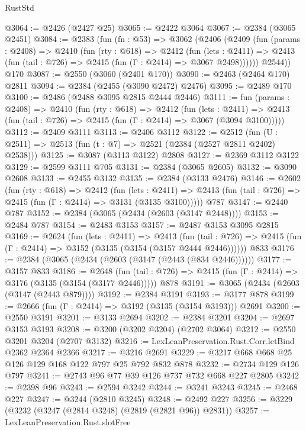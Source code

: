 \begin{lexlean}{RustStd}
\begin{coremodule}
@3064 := @2426 (@2427 @25)
@3065 := @2422 @3064
@3067 := @2384 (@3065 @2451)
@3084 := @2383
    (fun (fn : @53) =>
    @3062
      (@2406
        (@2409
          (fun (params : @2408) =>
          @2410
            (fun (rty : @618) =>
            @2412
              (fun (lets : @2411) =>
              @2413 (fun (tail : @726) => @2415 (fun (Γ : @2414) => @3067 @2498))))))
        @2544))
    @170
@3087 := @2550 (@3060 (@2401 @170))
@3090 := @2463 (@2464 @170) @2811
@3094 := @2384 (@2455 (@3090 @2472) @2476)
@3095 := @2489 @170
@3100 := @2486 (@2488 @3095 @2815 @2444 @2446)
@3111 := fun (params : @2408) =>
  @2410
    (fun (rty : @618) =>
    @2412
      (fun (lets : @2411) =>
      @2413 (fun (tail : @726) => @2415 (fun (Γ : @2414) => @3067 (@3094 @3100)))))
@3112 := @2409 @3111
@3113 := @2406 @3112
@3122 := @2512 (fun (U : @2511) => @2513 (fun (t : @7) => @2521 (@2384 (@2527 @2811 @2402) @2538)))
@3125 := @3087 (@3113 @3122) @2808
@3127 := @2369 @3112 @3122
@3129 := @2599 @3111 @705
@3131 := @2384 (@3065 @2605)
@3132 := @3090 @2608
@3133 := @2455 @3132
@3135 := @2384 (@3133 @2476)
@3146 := @2602
    (fun (rty : @618) =>
    @2412
      (fun (lets : @2411) =>
      @2413 (fun (tail : @726) => @2415 (fun (Γ : @2414) => @3131 (@3135 @3100)))))
    @787
@3147 := @2440 @787
@3152 := @2384 (@3065 (@2434 (@2603 (@3147 @2448))))
@3153 := @2484 @787
@3154 := @2483 @3153
@3157 := @2487 @3153 @3095 @2815
@3169 := @2624
    (fun (lets : @2411) =>
    @2413
      (fun (tail : @726) => @2415 (fun (Γ : @2414) => @3152 (@3135 (@3154 (@3157 @2444 @2446))))))
    @833
@3176 := @2384 (@3065 (@2434 (@2603 (@3147 (@2443 (@834 @2446))))))
@3177 := @3157 @833
@3186 := @2648
    (fun (tail : @726) => @2415 (fun (Γ : @2414) => @3176 (@3135 (@3154 (@3177 @2446)))))
    @878
@3191 := @3065 (@2434 (@2603 (@3147 (@2443 @879))))
@3192 := @2384 @3191
@3193 := @3177 @878
@3199 := @2666 (fun (Γ : @2414) => @3192 (@3135 (@3154 @3193))) @2691
@3200 := @2550 @3191
@3201 := @3133 @2694
@3202 := @2384 @3201
@3204 := @2697 @3153 @3193
@3208 := @3200 (@3202 @3204) (@2702 @3064)
@3212 := @2550 @3201 @3204 (@2707 @3132)
@3216 := LexLeanPreservation.Rust.Corr.letBind @2362 @2364 @2366
@3217 := @3216 @2691
@3229 := @3217 @668 @668 @25 @126 @129 @168 @122 @797 @25 @792 @832 @878
@3232 := @2734 @129 @126 @797
@3241 := @2743 @96 @77 @39 @126 @737 @732 @668 @227 @2805
@3242 := @2398 @96
@3243 := @2594 @3242
@3244 := @3241 @3243
@3245 := @2468 @227
@3247 := @3244 (@2810 @3245)
@3248 := @2492 @227
@3256 := @3229 (@3232 (@3247 (@2814 @3248) (@2819 (@2821 @96)) @2831))
@3257 := LexLeanPreservation.Rust.slotFree

\end{coremodule}
\end{lexlean}
